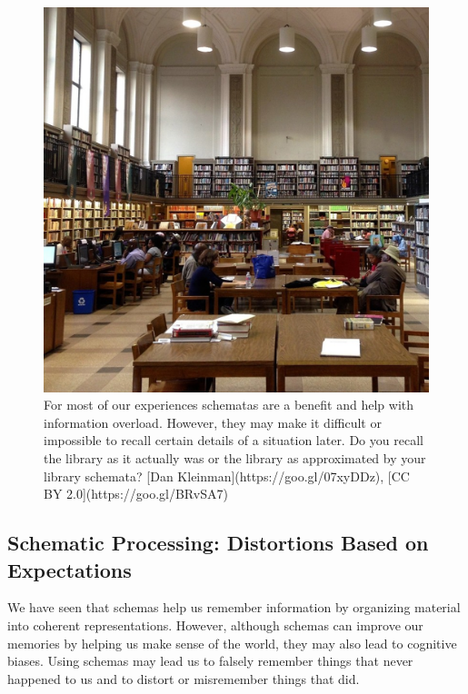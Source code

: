 \documentclass[
]{krantz}
\begin{document}
\begin{figure}

{\centering \includegraphics[width=0.6\linewidth]{images/ch6/fig1} 

}

\caption{For most of our experiences schematas are a benefit and help with information overload. However, they may make it difficult or impossible to recall certain details of a situation later. Do you recall the library as it actually was or the library as approximated by your library schemata? [Dan Kleinman](https://goo.gl/07xyDDz), [CC BY 2.0](https://goo.gl/BRvSA7)}\label{fig:library2}
\end{figure}

\subsection*{Schematic Processing: Distortions Based on Expectations}\label{schematic-processing-distortions-based-on-expectations}


We have seen that schemas help us remember information by organizing material into coherent representations. However, although schemas can improve our memories by helping us make sense of the world, they may also lead to cognitive biases. Using schemas may lead us to falsely remember things that never happened to us and to distort or misremember things that did.
\end{document}
